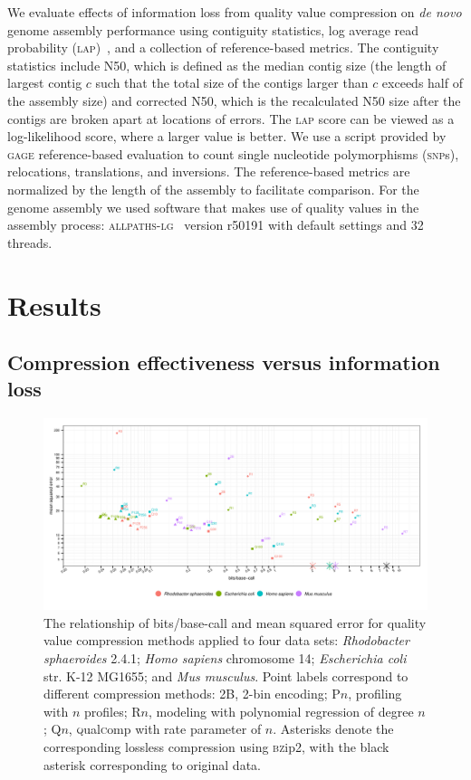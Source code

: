 \documentclass{bioinfo}
\begin{document}
\begin{methods}
We evaluate effects of information loss from quality value compression
on \emph{de novo} genome assembly performance using contiguity
statistics, log average read probability
(\textsc{lap})~\citep{Ghodsi:2013hb}, and a collection of
reference-based metrics. The contiguity statistics include N50, which
is defined as the median contig size (the length of largest contig $c$
such that the total size of the contigs larger than $c$ exceeds half
of the assembly size) and corrected N50, which is the recalculated N50
size after the contigs are broken apart at locations of errors. The
\textsc{lap} score can be viewed as a log-likelihood score, where a
larger value is better. We use a script provided by \textsc{gage}
reference-based evaluation to count single nucleotide polymorphisms
(\textsc{snp}s), relocations, translations, and inversions. The
reference-based metrics are normalized by the length of the assembly
to facilitate comparison. For the genome assembly we used software
that makes use of quality values in the assembly process:
\textsc{allpaths-lg}~\citep{Gnerre:2011kx} version r50191 with default
settings and 32 threads.

\end{methods}

\section{Results}

\subsection{Compression effectiveness versus information loss}

\begin{figure}[!tb]
\centerline{\includegraphics[width=7in]{compression_results.pdf}}
\caption{The relationship of bits/base-call and mean squared error for
  quality value compression methods applied to four data sets:
  \textit{Rhodobacter sphaeroides} 2.4.1; \textit{Homo sapiens}
  chromosome 14; \textit{Escherichia coli} str. K-12 MG1655; and
  \textit{Mus musculus}. Point labels correspond to different
  compression methods: 2B, 2-bin encoding; P$n$, profiling with $n$
  profiles; R$n$, modeling with polynomial regression of degree $n$;
  Q$n$, \textsc{q}ual\textsc{c}omp with rate parameter of
  $n$. Asterisks denote the corresponding lossless compression using
  \textsc{bz}ip2, with the black asterisk corresponding to original
  data.}
\label{fig:mse_vs_bpbp}
\end{figure}
\end{document}
